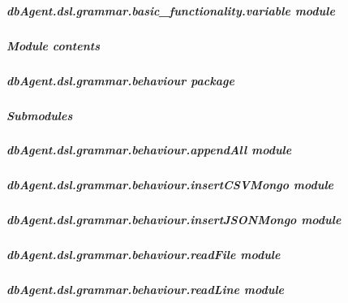 \documentclass[letterpaper,10pt,english]{sphinxmanual}
\begin{document}
\subparagraph{dbAgent.dsl.grammar.basic\_functionality.variable module}
\label{dbAgent.dsl.grammar.basic_functionality:dbagent-dsl-grammar-basic-functionality-variable-module}

\subparagraph{Module contents}
\label{dbAgent.dsl.grammar.basic_functionality:module-dbAgent.dsl.grammar.basic_functionality}\label{dbAgent.dsl.grammar.basic_functionality:module-contents}

\subparagraph{dbAgent.dsl.grammar.behaviour package}
\label{dbAgent.dsl.grammar.behaviour:dbagent-dsl-grammar-behaviour-package}\label{dbAgent.dsl.grammar.behaviour::doc}

\subparagraph{Submodules}
\label{dbAgent.dsl.grammar.behaviour:submodules}

\subparagraph{dbAgent.dsl.grammar.behaviour.appendAll module}
\label{dbAgent.dsl.grammar.behaviour:dbagent-dsl-grammar-behaviour-appendall-module}

\subparagraph{dbAgent.dsl.grammar.behaviour.insertCSVMongo module}
\label{dbAgent.dsl.grammar.behaviour:dbagent-dsl-grammar-behaviour-insertcsvmongo-module}

\subparagraph{dbAgent.dsl.grammar.behaviour.insertJSONMongo module}
\label{dbAgent.dsl.grammar.behaviour:dbagent-dsl-grammar-behaviour-insertjsonmongo-module}

\subparagraph{dbAgent.dsl.grammar.behaviour.readFile module}
\label{dbAgent.dsl.grammar.behaviour:module-dbAgent.dsl.grammar.behaviour.readFile}\label{dbAgent.dsl.grammar.behaviour:dbagent-dsl-grammar-behaviour-readfile-module}

\begin{fulllineitems}
\label{dbAgent.dsl.grammar.behaviour:dbAgent.dsl.grammar.behaviour.readFile.readFile}
\end{fulllineitems}



\subparagraph{dbAgent.dsl.grammar.behaviour.readLine module}
\label{dbAgent.dsl.grammar.behaviour:dbagent-dsl-grammar-behaviour-readline-module}\label{dbAgent.dsl.grammar.behaviour:module-dbAgent.dsl.grammar.behaviour.readLine}
\end{document}
